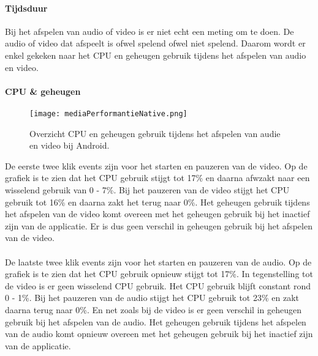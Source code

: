 \paragraph{Tijdsduur}
Bij het afspelen van audio of video is er niet echt een meting om te doen. 
De audio of video dat afspeelt is ofwel spelend ofwel niet spelend.
Daarom wordt er enkel gekeken naar het CPU en geheugen gebruik tijdens 
het afspelen van audio en video.

\paragraph{CPU \& geheugen}
\begin{figure}[H]
    \centering
    \texttt{[image: mediaPerformantieNative.png]}
    \caption{Overzicht CPU en geheugen gebruik tijdens het afspelen van audie en video bij Android.}
\end{figure}
De eerste twee klik events zijn voor het starten en pauzeren van de video. Op de grafiek 
is te zien dat het CPU gebruik stijgt tot 17\% en daarna afwzakt naar een wisselend gebruik 
van 0 - 7\%. Bij het pauzeren van de video stijgt het CPU gebruik tot 16\% en daarna
zakt het terug naar 0\%. Het geheugen gebruik tijdens het afspelen van de video komt overeen 
met het geheugen gebruik bij het inactief zijn van de applicatie. Er is dus geen verschil in
geheugen gebruik bij het afspelen van de video.
\\\\
De laatste twee klik events zijn voor het starten en pauzeren van de audio. Op de grafiek
is te zien dat het CPU gebruik opnieuw stijgt tot 17\%. In tegenstelling tot de video is 
er geen wisselend CPU gebruik. Het CPU gebruik blijft constant rond 0 - 1\%. Bij het pauzeren
van de audio stijgt het CPU gebruik tot 23\% en zakt daarna terug naar 0\%. En net zoals bij de 
video is er geen verschil in geheugen gebruik bij het afspelen van de audio. Het geheugen gebruik
tijdens het afspelen van de audio komt opnieuw overeen met het geheugen gebruik bij het inactief zijn van
de applicatie.